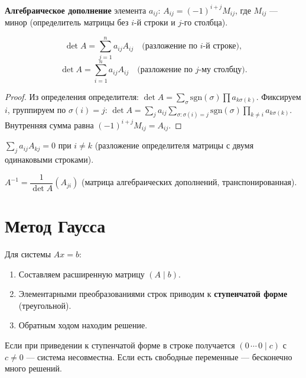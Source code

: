 \documentclass[12pt]{article}
\begin{document}
\begin{definition}
\textbf{Алгебраическое дополнение} элемента $a_{ij}$:
$A_{ij} = (-1)^{i+j} M_{ij}$, где $M_{ij}$ --- минор
(определитель матрицы без $i$-й строки и $j$-го столбца).
\end{definition}

\begin{theorem}
\[
\det A = \sum_{j=1}^n a_{ij} A_{ij}
\quad\text{(разложение по $i$-й строке)},
\]
\[
\det A = \sum_{i=1}^n a_{ij} A_{ij}
\quad\text{(разложение по $j$-му столбцу)}.
\]
\end{theorem}

\begin{proof}
Из определения определителя:
$\det A = \sum_{\sigma} \mathrm{sgn}(\sigma) \prod a_{k\sigma(k)}$.
Фиксируем $i$, группируем по $\sigma(i) = j$:
$\det A = \sum_j a_{ij} \sum_{\sigma:\sigma(i)=j} \mathrm{sgn}(\sigma)
\prod_{k\neq i} a_{k\sigma(k)}$.
Внутренняя сумма равна $(-1)^{i+j} M_{ij} = A_{ij}$.
\end{proof}

\begin{corollary}
$\sum_j a_{ij} A_{kj} = 0$ при $i \neq k$
(разложение определителя матрицы с двумя одинаковыми строками).
\end{corollary}

\begin{corollary}
$A^{-1} = \dfrac{1}{\det A}(A_{ji})$ (матрица алгебраических дополнений, транспонированная).
\end{corollary}

\section{Метод Гаусса}

\begin{method}
Для системы $Ax = b$:
\begin{enumerate}
\item Составляем расширенную матрицу $(A \mid b)$.
\item Элементарными преобразованиями строк приводим к
      \textbf{ступенчатой форме} (треугольной).
\item Обратным ходом находим решение.
\end{enumerate}
Если при приведении к ступенчатой форме в строке получается
$(0\,\cdots\,0 \mid c)$ с $c \neq 0$ --- система несовместна.
Если есть свободные переменные --- бесконечно много решений.
\end{method}
\end{document}
